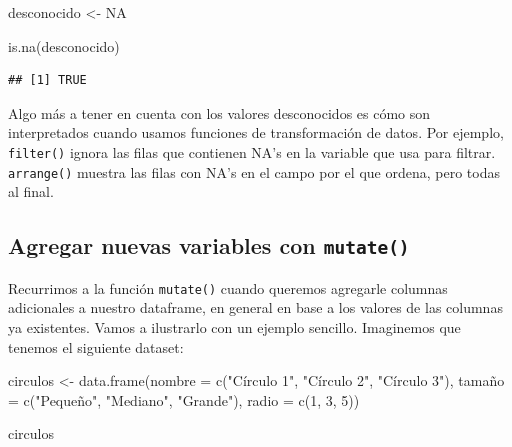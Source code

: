 \documentclass[
]{book}
\newenvironment{Shaded}{\begin{snugshade}}{\end{snugshade}}
\newcommand{\AttributeTok}[1]{\textcolor[rgb]{0.77,0.63,0.00}{#1}}
\newcommand{\ConstantTok}[1]{\textcolor[rgb]{0.00,0.00,0.00}{#1}}
\newcommand{\DecValTok}[1]{\textcolor[rgb]{0.00,0.00,0.81}{#1}}
\newcommand{\FunctionTok}[1]{\textcolor[rgb]{0.00,0.00,0.00}{#1}}
\newcommand{\NormalTok}[1]{#1}
\newcommand{\OtherTok}[1]{\textcolor[rgb]{0.56,0.35,0.01}{#1}}
\newcommand{\StringTok}[1]{\textcolor[rgb]{0.31,0.60,0.02}{#1}}
\begin{document}
\begin{Shaded}
\begin{Highlighting}[]
\NormalTok{desconocido }\OtherTok{\textless{}{-}} \ConstantTok{NA}

\FunctionTok{is.na}\NormalTok{(desconocido)}
\end{Highlighting}
\end{Shaded}

\begin{verbatim}
## [1] TRUE
\end{verbatim}

Algo más a tener en cuenta con los valores desconocidos es cómo son interpretados cuando usamos funciones de transformación de datos. Por ejemplo, \texttt{filter()} ignora las filas que contienen NA's en la variable que usa para filtrar. \texttt{arrange()} muestra las filas con NA's en el campo por el que ordena, pero todas al final.

\hypertarget{agregar-nuevas-variables-con-mutate}{%
\subsection{\texorpdfstring{Agregar nuevas variables con \texttt{mutate()}}{Agregar nuevas variables con mutate()}}\label{agregar-nuevas-variables-con-mutate}}

Recurrimos a la función \texttt{mutate()} cuando queremos agregarle columnas adicionales a nuestro dataframe, en general en base a los valores de las columnas ya existentes. Vamos a ilustrarlo con un ejemplo sencillo. Imaginemos que tenemos el siguiente dataset:

\begin{Shaded}
\begin{Highlighting}[]
\NormalTok{circulos }\OtherTok{\textless{}{-}} \FunctionTok{data.frame}\NormalTok{(}\AttributeTok{nombre =} \FunctionTok{c}\NormalTok{(}\StringTok{"Círculo 1"}\NormalTok{, }\StringTok{"Círculo 2"}\NormalTok{, }\StringTok{"Círculo 3"}\NormalTok{),}
\NormalTok{                       tamaño }\OtherTok{=} \FunctionTok{c}\NormalTok{(}\StringTok{"Pequeño"}\NormalTok{, }\StringTok{"Mediano"}\NormalTok{, }\StringTok{"Grande"}\NormalTok{),}
                       \AttributeTok{radio  =} \FunctionTok{c}\NormalTok{(}\DecValTok{1}\NormalTok{, }\DecValTok{3}\NormalTok{, }\DecValTok{5}\NormalTok{))}

\NormalTok{circulos}
\end{Highlighting}
\end{Shaded}
\end{document}
